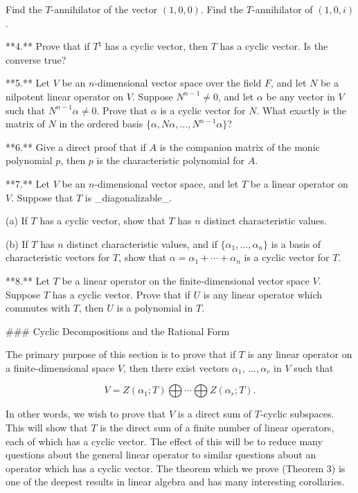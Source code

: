 
Find the \(T\)-annihilator of the vector \((1,0,0)\). Find the \(T\)-annihilator of \((1,0,i)\).

**4.** Prove that if \(T^{\natural}\) has a cyclic vector, then \(T\) has a cyclic vector. Is the converse true?

**5.** Let \(V\) be an \(n\)-dimensional vector space over the field \(F\), and let \(N\) be a nilpotent linear operator on \(V\). Suppose \(N^{n-1}\neq 0\), and let \(\alpha\) be any vector in \(V\) such that \(N^{n-1}\alpha\neq 0\). Prove that \(\alpha\) is a cyclic vector for \(N\). What exactly is the matrix of \(N\) in the ordered basis \(\{\alpha,N\alpha,\ldots,N^{n-1}\alpha\}\)?

**6.** Give a direct proof that if \(A\) is the companion matrix of the monic polynomial \(p\), then \(p\) is the characteristic polynomial for \(A\).

**7.** Let \(V\) be an \(n\)-dimensional vector space, and let \(T\) be a linear operator on \(V\). Suppose that \(T\) is _diagonalizable_.

(a) If \(T\) has a cyclic vector, show that \(T\) has \(n\) distinct characteristic values.

(b) If \(T\) has \(n\) distinct characteristic values, and if \(\{\alpha_{1},\ldots,\alpha_{n}\}\) is a basis of characteristic vectors for \(T\), show that \(\alpha=\alpha_{1}+\cdots+\alpha_{n}\) is a cyclic vector for \(T\).

**8.** Let \(T\) be a linear operator on the finite-dimensional vector space \(V\). Suppose \(T\) has a cyclic vector. Prove that if \(U\) is any linear operator which commutes with \(T\), then \(U\) is a polynomial in \(T\).

### Cyclic Decompositions and the Rational Form

The primary purpose of this section is to prove that if \(T\) is any linear operator on a finite-dimensional space \(V\), then there exist vectors \(\alpha_{1}\), \(\ldots,\alpha_{r}\) in \(V\) such that

\[V=Z(\alpha_{1};T)\bigoplus\cdots\bigoplus Z(\alpha_{r};T).\]

In other words, we wish to prove that \(V\) is a direct sum of \(T\)-cyclic subspaces. This will show that \(T\) is the direct sum of a finite number of linear operators, each of which has a cyclic vector. The effect of this will be to reduce many questions about the general linear operator to similar questions about an operator which has a cyclic vector. The theorem which we prove (Theorem 3) is one of the deepest results in linear algebra and has many interesting corollaries.

